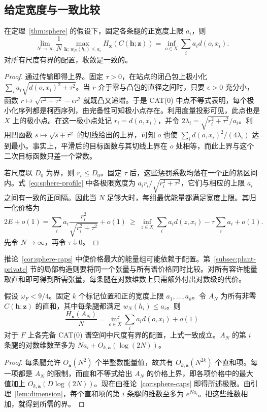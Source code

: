 \subsection{给定宽度与一致比较}

\begin{corollary}[给定宽度]\label{cor:sphere-caps}
在定理~\ref{thm:sphere} 的假设下，固定各条腿的正宽度上限 \(a_i\)，则
\begin{equation}\label{eq:sphere-caps}
 \lim_{N\to\infty}
 \frac{1}{N}\max_{\mathbf h:\,w_N(h_i)\le a_i}
            H_{\mathbf x}(C(\mathbf h;\mathbf z))
 = \inf_{o\in X}\sum_i a_i d(o,x_i).
\end{equation}
对所有尺度有界的配置，收敛是一致的。
\end{corollary}

\begin{proof}
通过传输即得上界。固定 \(\tau>0\)，在站点的闭凸包上极小化 \(\sum_i a_i\sqrt{d(o,x_i)^2+\tau^2}\)。当 \(r\) 介于零与凸包的直径之间时，只要 \(\epsilon>0\) 充分小，函数 \(r\mapsto\sqrt{r^2+\tau^2}-\epsilon r^2\) 就既凸又递增。于是 CAT(0) 中点不等式表明，每个极小化序列都是柯西序列，由完备性可知极小点存在。利用度量投影可见，此点也是 \(X\) 上的极小点。在这一极小点处记 \(r_i=d(o,x_i)\)，并令 \(2\lambda_i=\sqrt{r_i^2+\tau^2}/a_i\)。利用凹函数 \(s\mapsto\sqrt{s+\tau^2}\) 的切线给出的上界，可知 \(o\) 也使 \(\sum_i d(o,x_i)^2/(4\lambda_i)\) 达到最小。事实上，平滑后的目标函数与其切线上界在 \(o\) 处相等，而此上界与这个二次目标函数只差一个常数。

若尺度以 \(D_0\) 为界，则 \(r_i\le D_0\)。固定 \(\tau\) 后，这些惩罚系数均落在一个正的紧区间内。式~\eqref{eq:sphere-profile} 中各极限宽度为 \(a_i r_i/\sqrt{r_i^2+\tau^2}\)，它们与相应的上限 \(a_i\) 之间有一致的正间隔。因此当 \(N\) 足够大时，每组最优能量都满足宽度上限。其归一化价格为
\[
 2E+o(1)
 =\sum_i a_i\frac{r_i^2}{\sqrt{r_i^2+\tau^2}}+o(1)
 \ \ge\ \inf_{z\in X}\sum_i a_i d(z,x_i)-\tau\sum_i a_i+o(1).
\]
先令 \(N\to\infty\)，再令 \(\tau\downarrow0\)。
\end{proof}

推论~\ref{cor:sphere-caps} 中使价格最大的能量组可能依赖于配置。第~\ref{subsec:plant-private} 节的局部构造则要将同一个张量与所有谱价格同时比较。对所有容许能量取直和即可得到所需张量，每条腿在对数维数上只需额外付出对数级的代价。

\begin{corollary}[共同的比较张量]\label{cor:universal}
假设 \(\omega_F<9/4\)。固定 \(k\) 个标记位置和正的宽度上限 \(a_1,\ldots,a_k\)。令 \(A_N\) 为所有非零 \(C(\mathbf h;\mathbf z)\) 的直和，其中每条腿都满足 \(w_N(h_i)\le a_i\)。则
\[
 \frac{H_{\mathbf x}(A_N)}{N}=\inf_{o\in X}\sum_i a_i d(o,x_i)+o(1)
\]
对于 \(F\) 上各完备 CAT(0) 谱空间中尺度有界的配置，上式一致成立。\(A_N\) 的第 \(i\) 条腿的对数维数至多为 \(Na_i+O_{k,\mathbf a}(\log(2N))\)。
\end{corollary}

\begin{proof}
每条腿允许 \(O_{\mathbf a}(N^2)\) 个半整数能量值，故共有 \(O_{k,\mathbf a}(N^{2k})\) 个直和项。每一项都是 \(A_N\) 的限制，而直和不等式给出 \(A_N\) 的价格上界，即各项价格中的最大值加上 \(O_{k,\mathbf a}(D\log(2N))\)。现在由推论~\ref{cor:sphere-caps} 即得所述极限。由引理~\ref{lem:dimension}，每个直和项的第 \(i\) 条腿的维数至多为 \(e^{Na_i}\)。把这些维数相加，就得到所需的界。
\end{proof}
